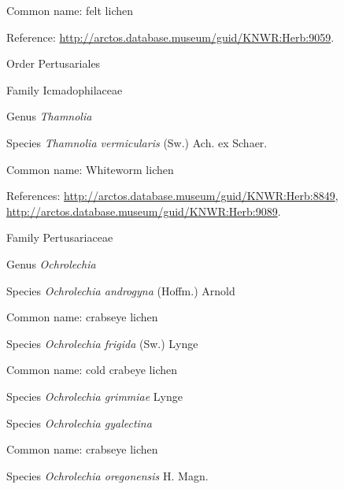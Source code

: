 \documentclass[9pt, article]{memoir}
\begin{document}
\begin{multicols}{2}
Common name: felt lichen

Reference: 
\url{http://arctos.database.museum/guid/KNWR:Herb:9059}.

\vspace{6pt}\noindent\hspace{18pt}Order Pertusariales


\vspace{6pt}\noindent\hspace{24pt}Family Icmadophilaceae


\vspace{6pt}\noindent\hspace{30pt}Genus \textit{Thamnolia}


\vspace{6pt}\noindent\hspace{36pt}Species \textit{Thamnolia vermicularis} (Sw.) Ach. ex Schaer.


Common name: Whiteworm lichen

References: 
\url{http://arctos.database.museum/guid/KNWR:Herb:8849}, 
\url{http://arctos.database.museum/guid/KNWR:Herb:9089}.

\vspace{6pt}\noindent\hspace{24pt}Family Pertusariaceae


\vspace{6pt}\noindent\hspace{30pt}Genus \textit{Ochrolechia}


\vspace{6pt}\noindent\hspace{36pt}Species \textit{Ochrolechia androgyna} (Hoffm.) Arnold


Common name: crabseye lichen

\vspace{6pt}\noindent\hspace{36pt}Species \textit{Ochrolechia frigida} (Sw.) Lynge


Common name: cold crabeye lichen

\vspace{6pt}\noindent\hspace{36pt}Species \textit{Ochrolechia grimmiae} Lynge


\vspace{6pt}\noindent\hspace{36pt}Species \textit{Ochrolechia gyalectina}


Common name: crabseye lichen

\vspace{6pt}\noindent\hspace{36pt}Species \textit{Ochrolechia oregonensis} H. Magn.



\end{multicols}
\end{document}
